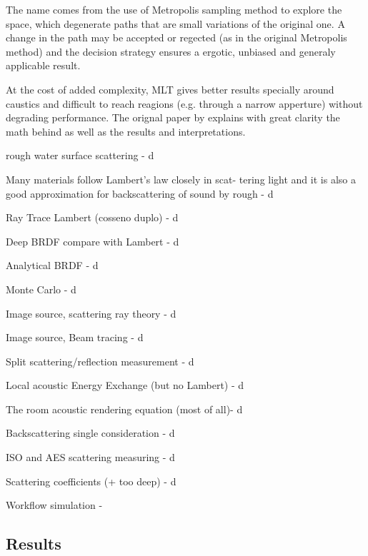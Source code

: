 The name comes from the use of Metropolis sampling method to explore the space,
which degenerate paths that are small variations of the original one. A change
in the path may be accepted or regected (as in the original Metropolis method)
and the decision strategy ensures a ergotic, unbiased and generaly applicable
result.

At the cost of added complexity, MLT gives better results specially around
caustics and difficult to reach reagions (e.g. through a narrow apperture)
without degrading performance. The orignal paper by \citet{veach1997metropolis}
explains with great clarity the math behind as well as the results and
interpretations.




rough water surface scattering - \citet{jones2009modelling}d

Many materials follow Lambert's law closely in scat-
tering light and it is also a good approximation for
backscattering of sound by rough - \citet{blake1995remote}d

Ray Trace Lambert (cosseno duplo) - \citet{cox2004acoustic}d

Deep BRDF compare with Lambert - \citet{miller2015real}d

Analytical BRDF - \citet{durany2015analytical}d

Monte Carlo - \citet{munjal2013formulas}d

Image source, scattering ray theory - \citet{chandak2011fast} d

Image source, Beam tracing - \citet{funkhouser2003survey}d

Split scattering/reflection measurement - \citet{vorlander2000definition}d

Local acoustic Energy Exchange (but no Lambert) - \citet{rober2007ray}d

The room acoustic rendering equation (most of all)- \citet{siltanen2007room}d

Backscattering single consideration - \citet{LURTON,Etter2013}d

ISO and AES scattering measuring - \citet{rindel2001scattering}d

Scattering coefficients (+ too deep) - \citet{cox2006tutorial}d

Workflow simulation - \citet{bell1997simulation}

\subsection{Results}
